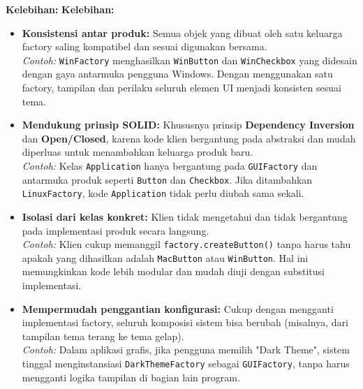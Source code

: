 \textbf{Kelebihan:}
\textbf{Kelebihan:}
\begin{itemize}
	\item \textbf{Konsistensi antar produk:} Semua objek yang dibuat oleh satu keluarga factory saling kompatibel dan sesuai digunakan bersama. \\
	\textit{Contoh:} \texttt{WinFactory} menghasilkan \texttt{WinButton} dan \texttt{WinCheckbox} yang didesain dengan gaya antarmuka pengguna Windows. Dengan menggunakan satu factory, tampilan dan perilaku seluruh elemen UI menjadi konsisten sesuai tema.
	
	\item \textbf{Mendukung prinsip SOLID:} Khususnya prinsip \textbf{Dependency Inversion} dan \textbf{Open/Closed}, karena kode klien bergantung pada abstraksi dan mudah diperluas untuk menambahkan keluarga produk baru. \\
	\textit{Contoh:} Kelas \texttt{Application} hanya bergantung pada \texttt{GUIFactory} dan antarmuka produk seperti \texttt{Button} dan \texttt{Checkbox}. Jika ditambahkan \texttt{LinuxFactory}, kode \texttt{Application} tidak perlu diubah sama sekali.
	
	\item \textbf{Isolasi dari kelas konkret:} Klien tidak mengetahui dan tidak bergantung pada implementasi produk secara langsung. \\
	\textit{Contoh:} Klien cukup memanggil \texttt{factory.createButton()} tanpa harus tahu apakah yang dihasilkan adalah \texttt{MacButton} atau \texttt{WinButton}. Hal ini memungkinkan kode lebih modular dan mudah diuji dengan substitusi implementasi.
	
	\item \textbf{Mempermudah penggantian konfigurasi:} Cukup dengan mengganti implementasi factory, seluruh komposisi sistem bisa berubah (misalnya, dari tampilan tema terang ke tema gelap). \\
	\textit{Contoh:} Dalam aplikasi grafis, jika pengguna memilih "Dark Theme", sistem tinggal menginstansiasi \texttt{DarkThemeFactory} sebagai \texttt{GUIFactory}, tanpa harus mengganti logika tampilan di bagian lain program.
\end{itemize}

